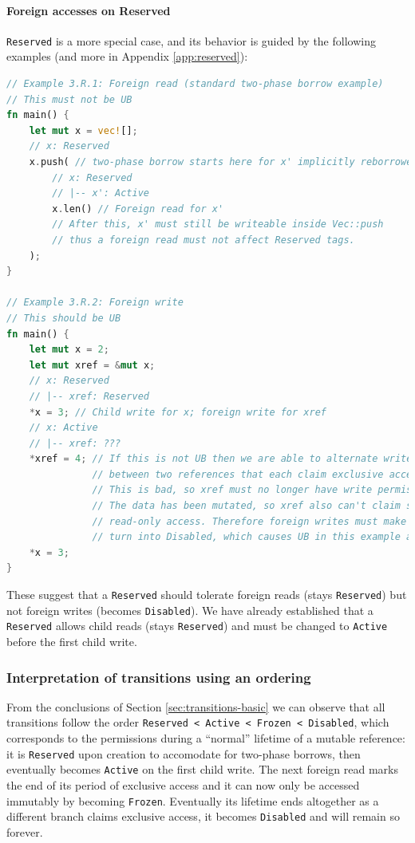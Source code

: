 \documentclass[a4paper,11pt]{article}
\theoremstyle{plain}
\theoremstyle{definition}
\theoremstyle{remark}
\newcommand{\tperm}[1]{\texttt{#1}}
\begin{document}
\paragraph*{Foreign accesses on Reserved}
\label{sec:reserved}

\tperm{Reserved} is a more special case, and its behavior is guided by the following examples
(and more in Appendix \ref{app:reserved}):
\begin{lstlisting}[language=rust]
// Example 3.R.1: Foreign read (standard two-phase borrow example)
// This must not be UB
fn main() {
    let mut x = vec![];
    // x: Reserved
    x.push( // two-phase borrow starts here for x' implicitly reborrowed from x
        // x: Reserved
        // |-- x': Active
        x.len() // Foreign read for x'
        // After this, x' must still be writeable inside Vec::push
        // thus a foreign read must not affect Reserved tags.
    );
}

// Example 3.R.2: Foreign write
// This should be UB
fn main() {
    let mut x = 2;
    let mut xref = &mut x;
    // x: Reserved
    // |-- xref: Reserved
    *x = 3; // Child write for x; foreign write for xref
    // x: Active
    // |-- xref: ???
    *xref = 4; // If this is not UB then we are able to alternate writes
               // between two references that each claim exclusive access.
               // This is bad, so xref must no longer have write permissions.
               // The data has been mutated, so xref also can't claim shared
               // read-only access. Therefore foreign writes must make Reserved
               // turn into Disabled, which causes UB in this example as desired.
    *x = 3;
}

\end{lstlisting}

These suggest that a \tperm{Reserved} should tolerate foreign reads (stays \tperm{Reserved})
but not foreign writes (becomes \tperm{Disabled}). We have already established that
a \tperm{Reserved} allows child reads (stays \tperm{Reserved}) and must be changed
to \tperm{Active} before the first child write.


\subsubsection{Interpretation of transitions using an ordering}

From the conclusions of Section \ref{sec:transitions-basic} we can observe that all transitions follow the order
\tperm{Reserved < Active < Frozen < Disabled}, which corresponds to the permissions
during a ``normal'' lifetime of a mutable reference: it is \tperm{Reserved} upon creation
to accomodate for two-phase borrows, then eventually becomes \tperm{Active} on the first
child write. The next foreign read marks the end of its period of exclusive access
and it can now only be accessed immutably by becoming \tperm{Frozen}. Eventually its
lifetime ends altogether as a different branch claims exclusive access, it
becomes \tperm{Disabled} and will remain so forever.
\end{document}
